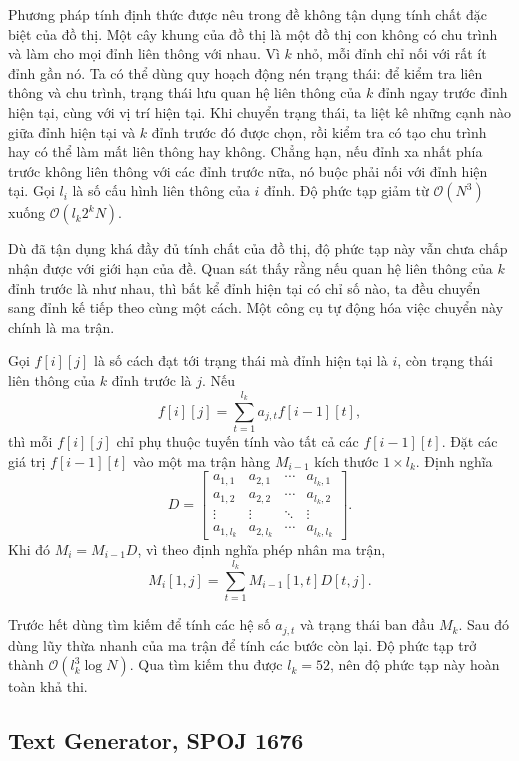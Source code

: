 \documentclass[11pt]{article}
\newcommand{\Oh}{\mathcal{O}}
\begin{document}
Phương pháp tính định thức được nêu trong đề không tận dụng tính chất đặc biệt
của đồ thị. Một cây khung của đồ thị là một đồ thị con không có chu trình và
làm cho mọi đỉnh liên thông với nhau. Vì \(k\) nhỏ, mỗi đỉnh chỉ nối với rất
ít đỉnh gần nó. Ta có thể dùng quy hoạch động nén trạng thái: để kiểm tra liên
thông và chu trình, trạng thái lưu quan hệ liên thông của \(k\) đỉnh ngay
trước đỉnh hiện tại, cùng với vị trí hiện tại. Khi chuyển trạng thái, ta liệt
kê những cạnh nào giữa đỉnh hiện tại và \(k\) đỉnh trước đó được chọn, rồi
kiểm tra có tạo chu trình hay có thể làm mất liên thông hay không. Chẳng hạn,
nếu đỉnh xa nhất phía trước không liên thông với các đỉnh trước nữa, nó buộc
phải nối với đỉnh hiện tại. Gọi \(l_i\) là số cấu hình liên thông của \(i\)
đỉnh. Độ phức tạp giảm từ \(\Oh(N^3)\) xuống \(\Oh(l_k2^kN)\).

Dù đã tận dụng khá đầy đủ tính chất của đồ thị, độ phức tạp này vẫn chưa chấp
nhận được với giới hạn của đề. Quan sát thấy rằng nếu quan hệ liên thông của
\(k\) đỉnh trước là như nhau, thì bất kể đỉnh hiện tại có chỉ số nào, ta đều
chuyển sang đỉnh kế tiếp theo cùng một cách. Một công cụ tự động hóa việc
chuyển này chính là ma trận.

Gọi \(f[i][j]\) là số cách đạt tới trạng thái mà đỉnh hiện tại là \(i\), còn
trạng thái liên thông của \(k\) đỉnh trước là \(j\). Nếu
\[
  f[i][j]=\sum_{t=1}^{l_k} a_{j,t} f[i-1][t],
\]
thì mỗi \(f[i][j]\) chỉ phụ thuộc tuyến tính vào tất cả các \(f[i-1][t]\). Đặt
các giá trị \(f[i-1][t]\) vào một ma trận hàng \(M_{i-1}\) kích thước
\(1\times l_k\). Định nghĩa
\[
  D=
  \begin{bmatrix}
    a_{1,1}&a_{2,1}&\cdots&a_{l_k,1}\\
    a_{1,2}&a_{2,2}&\cdots&a_{l_k,2}\\
    \vdots&\vdots&\ddots&\vdots\\
    a_{1,l_k}&a_{2,l_k}&\cdots&a_{l_k,l_k}
  \end{bmatrix}.
\]
Khi đó \(M_i=M_{i-1}D\), vì theo định nghĩa phép nhân ma trận,
\[
  M_i[1,j]=\sum_{t=1}^{l_k}M_{i-1}[1,t]D[t,j].
\]

Trước hết dùng tìm kiếm để tính các hệ số \(a_{j,t}\) và trạng thái ban đầu
\(M_k\). Sau đó dùng lũy thừa nhanh của ma trận để tính các bước còn lại. Độ
phức tạp trở thành \(\Oh(l_k^3\log N)\). Qua tìm kiếm thu được \(l_k=52\), nên
độ phức tạp này hoàn toàn khả thi.

\subsection{Text Generator, SPOJ 1676}
\end{document}
